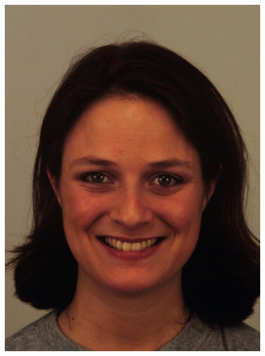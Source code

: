 \documentclass{Project}
\begin{document}
\begin{figure}[h!]
  \centering
  \begin{minipage}[b]{0.4\linewidth}
    \includegraphics[width=\linewidth]{AF01HAS.JPG}
  \end{minipage}
  \begin{minipage}[b]{0.4\linewidth}

\end{minipage}
\end{figure}
\end{document}
